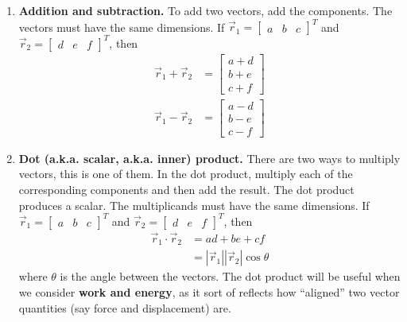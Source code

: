 \documentclass{tufte-handout}
\begin{document}
\begin{enumerate}
\item \textbf{Addition and subtraction.} To add two vectors, add the components. The vectors must have the same dimensions. If $\vec{r}_1 = \begin{bmatrix}a&b& c\end{bmatrix}^T$ and $\vec{r}_2 = \begin{bmatrix}d&e&f\end{bmatrix}^T$, then
\begin{align}
\vec{r}_1 + \vec{r}_2 &= \begin{bmatrix}a+d\\b+e\\c+f\end{bmatrix} \\
\vec{r}_1 - \vec{r}_2 &= \begin{bmatrix}a-d\\b-e\\c-f\end{bmatrix}
\end{align}

\item \textbf{Dot (a.k.a. scalar, a.k.a. inner) product.} There are two ways to multiply vectors, this is one of them. In the dot product, multiply each of the corresponding components and then add the result. The dot product produces a scalar. The multiplicands must have the same dimensions. If $\vec{r}_1 = \begin{bmatrix}a&b& c\end{bmatrix}^T$ and $\vec{r}_2 = \begin{bmatrix}d&e&f\end{bmatrix}^T$, then
\begin{align}
\vec{r}_1 \cdot \vec{r}_2 &= ad + be + cf \\
&= | \vec{r}_1 | | \vec{r}_2 | \cos\theta
\end{align}
where $\theta$ is the angle between the vectors. The dot product will be useful when we consider \textbf{work and energy}, as it sort of reflects how ``aligned'' two vector quantities (say force and displacement) are. 


\end{enumerate}
\end{document}
